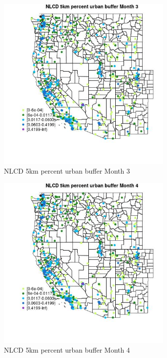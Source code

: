 \begin{figure} 
\centering  
\includegraphics[width=0.77\textwidth]{Code_Outputs/Report_ML_input_PM25_Step4_part_e_de_duplicated_aves_compiled_2019-05-14wNAs_MapObsMo3NLCD_5km_percent_urban_buffer.jpg} 
\caption{\label{fig:Report_ML_input_PM25_Step4_part_e_de_duplicated_aves_compiled_2019-05-14wNAsMapObsMo3NLCD_5km_percent_urban_buffer}NLCD 5km percent urban buffer Month 3} 
\end{figure} 
 

\begin{figure} 
\centering  
\includegraphics[width=0.77\textwidth]{Code_Outputs/Report_ML_input_PM25_Step4_part_e_de_duplicated_aves_compiled_2019-05-14wNAs_MapObsMo4NLCD_5km_percent_urban_buffer.jpg} 
\caption{\label{fig:Report_ML_input_PM25_Step4_part_e_de_duplicated_aves_compiled_2019-05-14wNAsMapObsMo4NLCD_5km_percent_urban_buffer}NLCD 5km percent urban buffer Month 4} 
\end{figure} 
 

